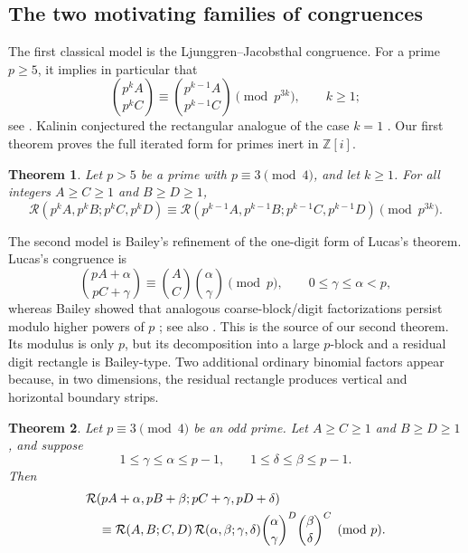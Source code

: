 \documentclass[a4paper,american,11pt]{amsart}
\numberwithin{equation}{section}
\newtheorem{theorem}{Theorem}[section]
\theoremstyle{definition}
\newcommand{\Z}{\mathbb Z}
\newcommand{\Rect}{\mathcal R}
\begin{document}
\subsection*{The two motivating families of congruences}

The first classical model is the Ljunggren--Jacobsthal congruence. For a prime $p\geq5$, it implies in particular that
\begin{equation}\label{eq:classical-iterated}
\binom{p^kA}{p^kC}
\equiv
\binom{p^{k-1}A}{p^{k-1}C}
\pmod{p^{3k}},
\qquad k\geq1;
\end{equation}
see \cite{BrunEtAl1949,Straub2011,Rowland2022}. Kalinin conjectured the rectangular analogue of the case $k=1$ \cite[Conjecture~3]{Kalinin2025}. Our first theorem proves the full iterated form for primes inert in $\Z[i]$.

\begin{theorem}\label{thm:ljunggren}
Let $p>5$ be a prime with $p\equiv3\pmod4$, and let $k\geq1$. For all integers $A\geq C\geq1$ and $B\geq D\geq1$,
\begin{equation}\label{eq:main-congruence}
\Rect(p^kA,p^kB;p^kC,p^kD)
\equiv
\Rect(p^{k-1}A,p^{k-1}B;p^{k-1}C,p^{k-1}D)
\pmod{p^{3k}}.
\end{equation}
\end{theorem}

The second model is Bailey's refinement of the one-digit form of Lucas's theorem. Lucas's congruence is
\[
\binom{pA+\alpha}{pC+\gamma}
\equiv
\binom{A}{C}\binom{\alpha}{\gamma}
\pmod p,
\qquad 0\leq\gamma\leq\alpha<p,
\]
whereas Bailey showed that analogous coarse-block/digit factorizations persist modulo higher powers of $p$ \cite{Bailey1990,Bailey1992}; see also \cite{DavisWebb1990,Granville1997,Rowland2022}. This is the source of our second theorem. Its modulus is only $p$, but its decomposition into a large $p$-block and a residual digit rectangle is Bailey-type. Two additional ordinary binomial factors appear because, in two dimensions, the residual rectangle produces vertical and horizontal boundary strips.

\begin{theorem}\label{thm:bailey}
Let $p\equiv3\pmod4$ be an odd prime. Let $A\geq C\geq1$ and $B\geq D\geq1$, and suppose
\[
1\leq\gamma\leq\alpha\leq p-1,
\qquad
1\leq\delta\leq\beta\leq p-1.
\]
Then
\begin{align}\label{eq:bailey-congruence}
&\Rect(pA+\alpha,pB+\beta;pC+\gamma,pD+\delta)\notag\\
&\quad\equiv
\Rect(A,B;C,D)\,
\Rect(\alpha,\beta;\gamma,\delta)
\binom{\alpha}{\gamma}^{D}
\binom{\beta}{\delta}^{C}
\pmod p.
\end{align}
\end{theorem}
\end{document}
